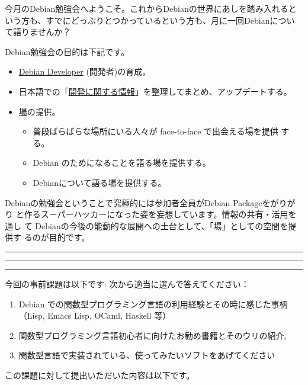 \documentclass[mingoth,a4paper]{jsarticle}
\begin{document}
\begin{multicols}{2}
 

 今月のDebian勉強会へようこそ。これからDebianの世界にあしを踏み入れると
 いう方も、すでにどっぷりとつかっているという方も、月に一回Debianについ
 て語りませんか？

 Debian勉強会の目的は下記です。

 \begin{itemize}
 \item \underline{Debian Developer} (開発者)の育成。
 \item 日本語での「\underline{開発に関する情報}」を整理してまとめ、アップデートする。
 \item \underline{場}の提供。
 \begin{itemize}
  \item 普段ばらばらな場所にいる人々が face-to-face で出会える場を提供
	する。
  \item Debian のためになることを語る場を提供する。
  \item Debianについて語る場を提供する。
 \end{itemize}
 \end{itemize}		

 Debianの勉強会ということで究極的には参加者全員がDebian Packageをがりがり
 と作るスーパーハッカーになった姿を妄想しています。情報の共有・活用を通し
 て Debianの今後の能動的な展開への土台として、「場」としての空間を提供す
 るのが目的です。

\end{multicols}

\newpage

\begin{minipage}[b]{0.2\hsize}
 \colorbox{titleback}{}
\end{minipage}
\begin{minipage}[b]{0.8\hsize}
\hrule
\vspace{2mm}
\hrule
\begin{multicols}{2}
\tableofcontents
\end{multicols}
\vspace{2mm}
\hrule
\end{minipage}


今回の事前課題は以下です:
次から適当に選んで答えてください： 
\begin{enumerate}

 \item Debian での関数型プログラミング言語の利用経験とその時に感じた事柄（Lisp, Emacs Lisp, OCaml, Haskell 等） 
 \item 関数型プログラミング言語初心者に向けたお勧め書籍とそのウリの紹介, 
 \item 関数型言語で実装されている、使ってみたいソフトをあげてください
\end{enumerate}
この課題に対して提出いただいた内容は以下です。
\begin{multicols}{2}
{\small

}
\end{multicols}
\end{document}
